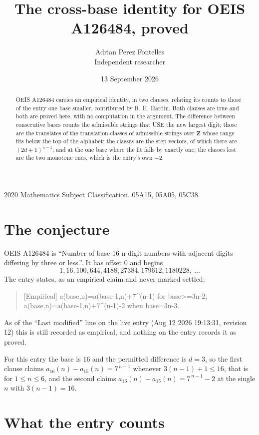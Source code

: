 \documentclass[11pt,a4paper]{article}
\title{The cross-base identity for OEIS A126484, proved}
\author{Adrian Perez Fontelles\\ \small Independent researcher}
\date{13 September 2026}
\theoremstyle{plain}
\theoremstyle{definition}
\begin{document}
\maketitle

\begin{abstract}
OEIS A126484 carries an empirical identity, in two clauses, relating its counts to those of the
entry one base smaller, contributed by R. H. Hardin. Both clauses are true and both are proved
here, with no computation in the argument. The difference between consecutive bases counts the
admissible strings that USE the new largest digit; those are the translates of the
translation-classes of admissible strings over $\mathbf{Z}$ whose range fits below the top of
the alphabet; the classes are the step vectors, of which there are $(2d+1)^{n-1}$; and at the
one base where the fit fails by exactly one, the classes lost are the two monotone ones, which
is the entry's own $-2$.
\end{abstract}

\noindent\small 2020 Mathematics Subject Classification. 05A15, 05A05, 05C38.\normalsize

\section{The conjecture}

OEIS A126484 is ``Number of base 16 n-digit numbers with adjacent digits differing by three or less.''. It has offset $0$ and begins
\[
1, 16, 100, 644, 4188, 27384, 179612, 1180228,\ \dots
\]
The entry states, as an empirical claim and never marked settled:
\begin{quote}
[Empirical] a(base,n)=a(base-1,n)+7\textasciicircum{}(n-1) for base>=3n-2; a(base,n)=a(base-1,n)+7\textasciicircum{}(n-1)-2 when base=3n-3.
\end{quote}
As of the ``Last modified'' line on the live entry (Aug 12 2026 19:13:31, revision 12)
this is still recorded as empirical, and nothing on the entry records it as proved.

For this entry the base is $16$ and the permitted difference is $d=3$, so the first clause
claims $a_{16}(n)-a_{15}(n)=7^{\,n-1}$ whenever $3(n-1)+1\le16$, that is for
$1\le n\le6$, and the second claims $a_{16}(n)-a_{15}(n)=7^{\,n-1}-2$ at the single
$n$ with $3(n-1)=16$.

\section{What the entry counts}
\end{document}
